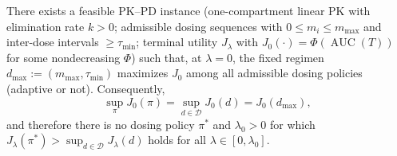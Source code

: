 ﻿\begin{theorem}\label{thm:pkpd-fixed-optimal}
There exists a feasible PK--PD instance (one-compartment linear PK with elimination rate $k>0$; admissible dosing sequences with $0\le m_i\le m_{\max}$ and inter-dose intervals $\ge \tau_{\min}$; terminal utility $J_{\lambda}$ with $J_0(\cdot)=\Phi(\operatorname{AUC}(T))$ for some nondecreasing $\Phi$) such that, at $\lambda=0$, the fixed regimen $d_{\max}:=(m_{\max},\tau_{\min})$ maximizes $J_0$ among all admissible dosing policies (adaptive or not). Consequently,
\[
\sup_{\pi} J_0(\pi)=\sup_{d\in\mathcal D} J_0(d)=J_0(d_{\max}),
\]
and therefore there is no dosing policy $\pi^*$ and $\lambda_0>0$ for which
$J_{\lambda}(\pi^*)>\sup_{d\in\mathcal D}J_{\lambda}(d)$ holds for all $\lambda\in[0,\lambda_0]$.
\end{theorem}

